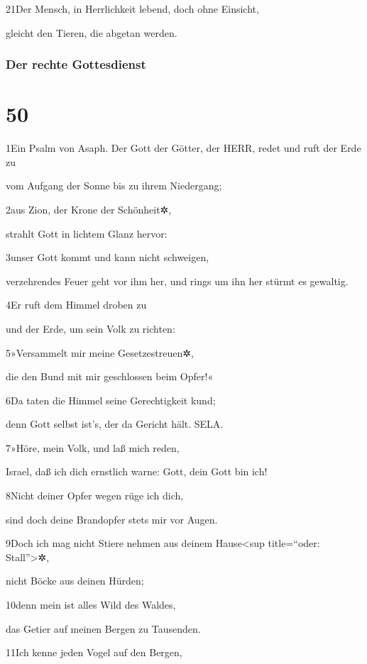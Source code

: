 21Der Mensch, in Herrlichkeit lebend, doch ohne Einsicht,

gleicht den Tieren, die abgetan werden.

\hypertarget{der-rechte-gottesdienst}{%
\subsubsection{Der rechte Gottesdienst}\label{der-rechte-gottesdienst}}

\hypertarget{section-49}{%
\section{50}\label{section-49}}

1Ein Psalm von Asaph. Der Gott der Götter, der HERR, redet und ruft der
Erde zu

vom Aufgang der Sonne bis zu ihrem Niedergang;

2aus Zion, der Krone der Schönheit✲,

strahlt Gott in lichtem Glanz hervor:

3unser Gott kommt und kann nicht schweigen,

verzehrendes Feuer geht vor ihm her, und rings um ihn her stürmt es
gewaltig.

4Er ruft dem Himmel droben zu

und der Erde, um sein Volk zu richten:

5»Versammelt mir meine Gesetzestreuen✲,

die den Bund mit mir geschlossen beim Opfer!«

6Da taten die Himmel seine Gerechtigkeit kund;

denn Gott selbst ist's, der da Gericht hält. SELA.

7»Höre, mein Volk, und laß mich reden,

Israel, daß ich dich ernstlich warne: Gott, dein Gott bin ich!

8Nicht deiner Opfer wegen rüge ich dich,

sind doch deine Brandopfer stets mir vor Augen.

9Doch ich mag nicht Stiere nehmen aus deinem Hause\textless sup
title=``oder: Stall''\textgreater✲,

nicht Böcke aus deinen Hürden;

10denn mein ist alles Wild des Waldes,

das Getier auf meinen Bergen zu Tausenden.

11Ich kenne jeden Vogel auf den Bergen,

